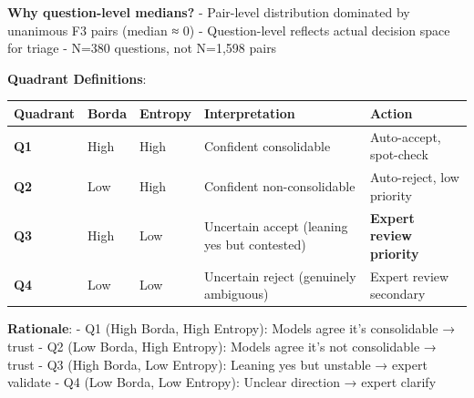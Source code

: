 \documentclass[
  letterpaper,
]{report}
\begin{document}
\textbf{Why question-level medians?} - Pair-level distribution dominated
by unanimous F3 pairs (median ≈ 0) - Question-level reflects actual
decision space for triage - N=380 questions, not N=1,598 pairs

\textbf{Quadrant Definitions}:

\begin{longtable}[]{@{}
  >{\raggedright\arraybackslash}p{}
  >{\raggedright\arraybackslash}p{}
  >{\raggedright\arraybackslash}p{}
  >{\raggedright\arraybackslash}p{}
  >{\raggedright\arraybackslash}p{}@{}}
\toprule\noalign{}
\begin{minipage}[b]{\linewidth}\raggedright
Quadrant
\end{minipage} & \begin{minipage}[b]{\linewidth}\raggedright
Borda
\end{minipage} & \begin{minipage}[b]{\linewidth}\raggedright
Entropy
\end{minipage} & \begin{minipage}[b]{\linewidth}\raggedright
Interpretation
\end{minipage} & \begin{minipage}[b]{\linewidth}\raggedright
Action
\end{minipage} \\
\midrule\noalign{}
\endhead
\bottomrule\noalign{}
\endlastfoot
\textbf{Q1} & High & High & Confident consolidable & Auto-accept,
spot-check \\
\textbf{Q2} & Low & High & Confident non-consolidable & Auto-reject, low
priority \\
\textbf{Q3} & High & Low & Uncertain accept (leaning yes but contested)
& \textbf{Expert review priority} \\
\textbf{Q4} & Low & Low & Uncertain reject (genuinely ambiguous) &
Expert review secondary \\
\end{longtable}

\textbf{Rationale}: - Q1 (High Borda, High Entropy): Models agree it's
consolidable → trust - Q2 (Low Borda, High Entropy): Models agree it's
not consolidable → trust - Q3 (High Borda, Low Entropy): Leaning yes but
unstable → expert validate - Q4 (Low Borda, Low Entropy): Unclear
direction → expert clarify
\end{document}
